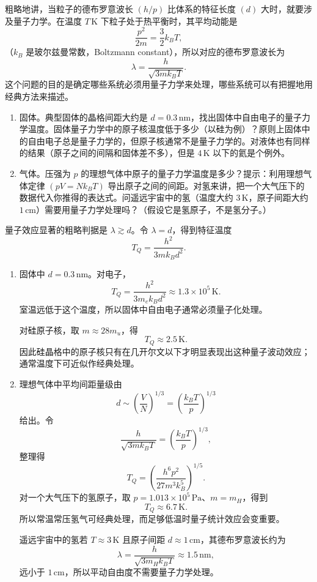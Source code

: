 \begin{question}
粗略地讲，当粒子的德布罗意波长 $(h/p)$ 比体系的特征长度 $(d)$ 大时，就要涉及量子力学。在温度 $T\,\mathrm{K}$ 下粒子处于热平衡时，其平均动能是
\[
\frac{p^2}{2m}=\frac{3}{2}k_B T,
\]
（$k_B$ 是玻尔兹曼常数，Boltzmann constant），所以对应的德布罗意波长为
\[
\lambda=\frac{h}{\sqrt{3mk_B T}}.
\tag{1.45}
\]
这个问题的目的是确定哪些系统必须用量子力学来处理，哪些系统可以有把握地用经典方法来描述。
\begin{enumerate}
\item 固体。典型固体的晶格间距大约是 $d=0.3\,\mathrm{nm}$，找出固体中自由电子的量子力学温度。固体量子力学中的原子核温度低于多少（以硅为例）？原则上固体中的自由电子总是量子力学的，但原子核通常不是量子力学的。对液体也有同样的结果（原子之间的间隔和固体差不多），但是 $4\,\mathrm{K}$ 以下的氦是个例外。
\item 气体。压强为 $p$ 的理想气体中原子的量子力学温度是多少？提示：利用理想气体定律 $(pV=Nk_BT)$ 导出原子之间的间距。对氢来讲，把一个大气压下的数据代入你推得的表达式。问遥远宇宙中的氢（温度大约 $3\,\mathrm{K}$，原子间距大约 $1\,\mathrm{cm}$）需要用量子力学处理吗？（假设它是氢原子，不是氢分子。）
\end{enumerate}
\end{question}
\begin{solution}
量子效应显著的粗略判据是 $\lambda\gtrsim d$。令 $\lambda=d$，得到特征温度
\[
T_Q=\frac{h^2}{3mk_Bd^2}.
\]
\begin{enumerate}
\item 固体中 $d=0.3\,\mathrm{nm}$。对电子，
\[
T_Q=\frac{h^2}{3m_ek_Bd^2}\approx 1.3\times10^5\,\mathrm{K}.
\]
室温远低于这个温度，所以固体中自由电子通常必须量子化处理。

对硅原子核，取 $m\approx 28m_u$，得
\[
T_Q\approx 2.5\,\mathrm{K}.
\]
因此硅晶格中的原子核只有在几开尔文以下才明显表现出这种量子波动效应；通常温度下可近似作经典处理。
\item 理想气体中平均间距量级由
\[
d\sim\left(\frac{V}{N}\right)^{1/3}=\left(\frac{k_BT}{p}\right)^{1/3}
\]
给出。令
\[
\frac{h}{\sqrt{3mk_BT}}=\left(\frac{k_BT}{p}\right)^{1/3},
\]
整理得
\[
T_Q=\left(\frac{h^6p^2}{27m^3k_B^5}\right)^{1/5}.
\]
对一个大气压下的氢原子，取 $p=1.013\times10^5\,\mathrm{Pa}$、$m=m_H$，得到
\[
T_Q\approx 6.7\,\mathrm{K}.
\]
所以常温常压氢气可经典处理，而足够低温时量子统计效应会变重要。

遥远宇宙中的氢若 $T\approx3\,\mathrm{K}$ 且原子间距 $d\approx1\,\mathrm{cm}$，其德布罗意波长约为
\[
\lambda=\frac{h}{\sqrt{3m_Hk_BT}}\approx1.5\,\mathrm{nm},
\]
远小于 $1\,\mathrm{cm}$，所以平动自由度不需要量子力学处理。
\end{enumerate}
\end{solution}
